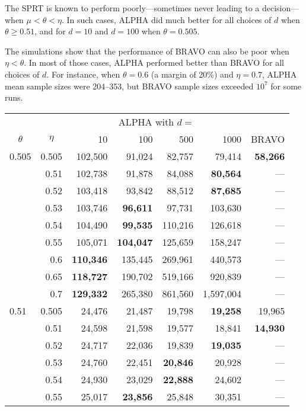 \documentclass[aoas]{imsart}
\begin{document}
The SPRT is known to perform poorly---sometimes never leading to a decision---when $\mu < \theta < \eta$.
In such cases, ALPHA did much better for all choices of $d$ when $\theta \ge 0.51$, and for $d= 10$ and $d=100$
when $\theta=0.505$.

The simulations show that the performance of BRAVO can also be poor when $\eta < \theta$.
In most of those cases, ALPHA performed better than BRAVO for all choices of $d$.
For instance, when $\theta=0.6$ (a margin of 20\%) and $\eta=0.7$,  ALPHA mean sample sizes were 204--353, but BRAVO sample sizes
exceeded $10^7$ for some runs.

\begin{table}
\centering
\tiny
\begin{tabular}{lr|rrrr|r}
  \multicolumn{2}{c|}{}    & \multicolumn{4}{|c|}{ALPHA with $d=$} & \multicolumn{1}{c}{} \\ 
\multicolumn{1}{c}{$\theta$}     &  \multicolumn{1}{c|}{$\eta$}   &  10 & 100 & 500 & 1000 & \multicolumn{1}{c}{BRAVO} \\
\hline
0.505 & 0.505 & 102,500 & 91,024 & 82,757 & 79,414 & \bf{58,266} \\
      & 0.51 & 102,738 & 91,878 & 84,088 & \bf{80,564} & --- \\
      & 0.52 & 103,418 & 93,842 & 88,512 & \bf{87,685} & --- \\
      & 0.53 & 103,746 & \bf{96,611} & 97,731 & 103,630 & --- \\
      & 0.54 & 104,490 & \bf{99,535} & 110,216 & 126,618 & --- \\
      & 0.55 & 105,071 & \bf{104,047} & 125,659 & 158,247 & --- \\
      & 0.6 & \bf{110,346} & 135,445 & 269,961 & 440,573 & --- \\
      & 0.65 & \bf{118,727} & 190,702 & 519,166 & 920,839 & --- \\
      & 0.7 & \bf{129,332} & 265,380 & 861,560 & 1,597,004 & --- \\
\hline
0.51 & 0.505 & 24,476 & 21,487 & 19,798 & \bf{19,258} & 19,965 \\
     & 0.51 & 24,598 & 21,598 & 19,577 & 18,841 & \bf{14,930} \\
     & 0.52 & 24,717 & 22,036 & 19,839 & \bf{19,035} & --- \\
     & 0.53 & 24,760 & 22,451 & \bf{20,846} & 20,928 & --- \\
     & 0.54 & 24,930 & 23,029 & \bf{22,888} & 24,602 & --- \\
     & 0.55 & 25,017 & \bf{23,856} & 25,848 & 30,351 & --- \\

\end{tabular}
\end{table}
\end{document}
